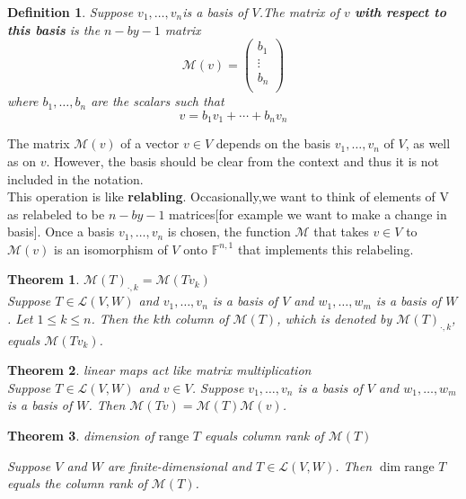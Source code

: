 \documentclass{article}
\newtheorem{theorem}{Theorem}[subsection]
\newtheorem{definition}{Definition}[subsection]
\newcommand{\FF}{\mathbb{F}}
\begin{document}
\begin{CJK}{UTF8}{gkai}
\begin{definition}
 Suppose $v_1,\ldots,v_n$is a basis of $V$.The matrix of $v$ \textbf{with respect to this basis} is the $n-by-1$ matrix
    \[\mathcal{M}(v) = \begin{pmatrix}
        b_1\\
        \vdots\\
        b_n\\
    \end{pmatrix}\]
 where $b_1,\ldots,b_n$ are the scalars such that
 \[v=b_1v_1+\cdots+b_n v_n\]
\end{definition}
The matrix $\mathcal{M}(v)$ of a vector $v \in V$ depends on the basis $v_1,\ldots,v_n$ of $V$, as well as on $v$. However, the basis should be clear from the context and thus it is not included in the notation.\\

This operation is like \textbf{relabling}. Occasionally,we want to think of elements of V as relabeled to be $n-by-1$ matrices[for example we want to make a change in basis]. Once a basis $v_1,\ldots,v_n$ is chosen, the function $\mathcal{M}$ that takes $v\in V$ to $\mathcal{M}(v)$ is an isomorphism of $V$ onto $\FF^{n,1}$ that implements this relabeling.\\

\begin{theorem}
    $\mathcal{M}(T)_{\cdot,k} = \mathcal{M}(Tv_k)$\\

    Suppose $T \in \mathcal{L}(V,W)$ and $v_1,\ldots,v_n$ is a basis of $V$ and $w_1,\ldots,w_m$ is a basis of $W$. Let $1 \leq k \leq n$. Then the $k$th column of $\mathcal{M}(T)$, which is denoted by $\mathcal{M}(T)_{\cdot,k} $, equals $\mathcal{M}(Tv_k)$.\\
\end{theorem}

\begin{theorem}
    linear maps act like matrix multiplication\\

    Suppose $T \in \mathcal{L}(V,W)$ and $v \in V$. Suppose $v_1,\ldots,v_n$ is a basis of $V$ and $w_1,\ldots,w_m$ is a basis of $W$. Then $\mathcal{M}(Tv) = \mathcal{M}(T)\mathcal{M}(v)$.\\
\end{theorem}

\begin{theorem}
    dimension of $\text{range~} T$ equals column rank of $\mathcal{M}(T)$

 Suppose $V$ and $W$ are finite-dimensional and $T \in \mathcal{L}(V,W)$. Then $\dim \text{range~}T$ equals the column rank of $\mathcal{M}(T)$.
\end{theorem}


\end{CJK}
\end{document}
